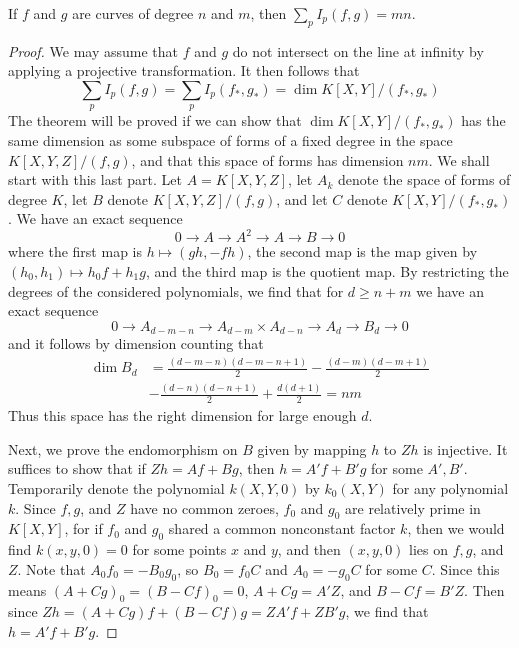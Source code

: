 \begin{theorem}
    If $f$ and $g$ are curves of degree $n$ and $m$, then $\sum_p I_p(f,g) = mn$.
\end{theorem}
\begin{proof}
    We may assume that $f$ and $g$ do not intersect on the line at infinity by applying a projective transformation. It then follows that
    \[ \sum_p I_p(f,g) = \sum_p I_p(f_*,g_*) = \dim K[X,Y]/(f_*,g_*) \]
    The theorem will be proved if we can show that $\dim K[X,Y]/(f_*,g_*)$ has the same dimension as some subspace of forms of a fixed degree in the space $K[X,Y,Z]/(f,g)$, and that this space of forms has dimension $nm$. We shall start with this last part. Let $A = K[X,Y,Z]$, let $A_k$ denote the space of forms of degree $K$, let $B$ denote $K[X,Y,Z]/(f,g)$, and let $C$ denote $K[X,Y]/(f_*,g_*)$. We have an exact sequence
    \[ 0 \to A \to A^2 \to A \to B \to 0 \]
    where the first map is $h \mapsto (gh,-fh)$, the second map is the map given by $(h_0,h_1) \mapsto h_0f + h_1g$, and the third map is the quotient map. By restricting the degrees of the considered polynomials, we find that for $d \geq n + m$ we have an exact sequence
    \[ 0 \to A_{d-m-n} \to A_{d-m} \times A_{d-n} \to A_d \to B_d \to 0 \]
    and it follows by dimension counting that
    \begin{align*}
        \dim B_d &= \frac{(d-m-n)(d-m-n+1)}{2} - \frac{(d-m)(d-m+1)}{2}\\
        &- \frac{(d-n)(d-n+1)}{2} + \frac{d(d+1)}{2} = nm
    \end{align*}
    Thus this space has the right dimension for large enough $d$.

    Next, we prove the endomorphism on $B$ given by mapping $h$ to $Zh$ is injective. It suffices to show that if $Zh = Af + Bg$, then $h = A'f + B'g$ for some $A',B'$. Temporarily denote the polynomial $k(X,Y,0)$ by $k_0(X,Y)$ for any polynomial $k$. Since $f,g$, and $Z$ have no common zeroes, $f_0$ and $g_0$ are relatively prime in $K[X,Y]$, for if $f_0$ and $g_0$ shared a common nonconstant factor $k$, then we would find $k(x,y,0) = 0$ for some points $x$ and $y$, and then $(x,y,0)$ lies on $f,g$, and $Z$. Note that $A_0f_0 = -B_0g_0$, so $B_0 = f_0C$ and $A_0 = -g_0C$ for some $C$. Since this means $(A + Cg)_0 = (B - Cf)_0 = 0$, $A + Cg = A'Z$, and $B - Cf = B'Z$. Then since $Zh = (A + Cg)f + (B-Cf)g = ZA'f + ZB'g$, we find that $h = A'f + B'g$.


\end{proof}
